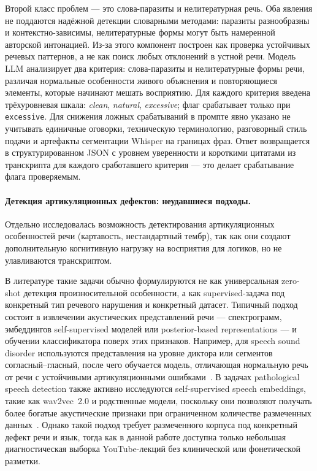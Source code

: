 Второй класс проблем — это слова-\nobreak\hspace{0pt}паразиты и нелитературная речь.
Оба явления не поддаются надёжной детекции словарными методами:
паразиты разнообразны и контекстно-зависимы, нелитературные формы
могут быть намеренной авторской интонацией.
Из-за этого компонент построен как проверка устойчивых речевых
паттернов, а не как поиск любых отклонений в устной речи.
Модель LLM анализирует два критерия: слова-паразиты и нелитературные формы речи, 
различая нормальные особенности живого объяснения и повторяющиеся элементы,
которые начинают мешать восприятию.
Для каждого критерия введена трёхуровневая шкала:
\textit{clean}, \textit{natural}, \textit{excessive};
флаг срабатывает только при \texttt{excessive}.
Для снижения ложных срабатываний в промпте явно указано не учитывать
единичные оговорки, техническую терминологию, разговорный стиль подачи
и артефакты сегментации Whisper на границах фраз.
Ответ возвращается в структурированном JSON с уровнем уверенности
и короткими цитатами из транскрипта для каждого сработавшего критерия —
это делает срабатывание флага проверяемым.

\paragraph{Детекция артикуляционных дефектов: неудавшиеся подходы.}

Отдельно исследовалась возможность детектирования артикуляционных особенностей
речи (картавость, нестандартный тембр), так как они создают дополнительную
когнитивную нагрузку на восприятия для логиков, но не улавливаются транскриптом.

В литературе такие задачи обычно формулируются не как универсальная
zero-shot детекция произносительной особенности, а как supervised-задача
под конкретный тип речевого нарушения и конкретный датасет. Типичный подход
состоит в извлечении акустических представлений речи — спектрограмм,
эмбеддингов self-supervised моделей или posterior-based representations —
и обучении классификатора поверх этих признаков. Например, для speech sound
disorder используются представления на уровне диктора или сегментов
согласный--гласный, после чего обучается модель, отличающая нормальную речь
от речи с устойчивыми артикуляционными ошибками~\cite{ng2022automatic,ng2021consonant}.
В задачах pathological speech detection также активно исследуются
self-supervised speech embeddings, такие как wav2vec~2.0 и родственные модели,
поскольку они позволяют получать более богатые акустические признаки при
ограниченном количестве размеченных данных~\cite{sheikh2024selfsupervised}.
Однако такой подход требует размеченного корпуса под конкретный дефект речи
и язык, тогда как в данной работе доступна только небольшая диагностическая
выборка YouTube-лекций без клинической или фонетической разметки.

